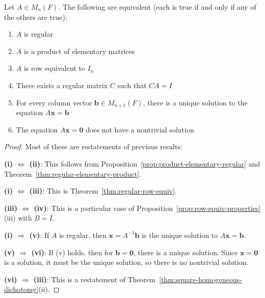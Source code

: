 \begin{theorem}\label{thm:regularity-characterizations}
    Let $A \in M_n(F)$. The following are equivalent (each is true if and only if any of the others are true):
    \begin{enumerate}[label=(\roman*)]
        \item $A$ is regular
        \item $A$ is a product of elementary matrices
        \item $A$ is row equivalent to $I_n$
        \item There exists a regular matrix $C$ such that $CA = I$
        \item For every column vector $\mathbf{b} \in M_{n \times 1}(F)$, there is a unique solution to the equation $A\mathbf{x} = \mathbf{b}$
        \item The equation $A\mathbf{x} = \mathbf{0}$ does not have a nontrivial solution
    \end{enumerate}
\end{theorem}

\begin{proof}
    Most of these are restatements of previous results:
    
    \textbf{(i) $\Leftrightarrow$ (ii)}: This follows from Proposition~\ref{prop:product-elementary-regular} and Theorem~\ref{thm:regular-elementary-product}.
    
    \textbf{(i) $\Leftrightarrow$ (iii)}: This is Theorem~\ref{thm:regular-row-equiv}.
    
    \textbf{(iii) $\Leftrightarrow$ (iv)}: This is a particular case of Proposition~\ref{prop:row-equiv-properties}(iii) with $B = I$.
    
    \textbf{(i) $\Rightarrow$ (v)}: If $A$ is regular, then $\mathbf{x} = A^{-1}\mathbf{b}$ is the unique solution to $A\mathbf{x} = \mathbf{b}$.
    
    \textbf{(v) $\Rightarrow$ (vi)}: If (v) holds, then for $\mathbf{b} = \mathbf{0}$, there is a unique solution. Since $\mathbf{x} = \mathbf{0}$ is a solution, it must be the unique solution, so there is no nontrivial solution.
    
    \textbf{(vi) $\Rightarrow$ (iii)}: This is a restatement of Theorem~\ref{thm:square-homogeneous-dichotomy}(ii).
\end{proof}